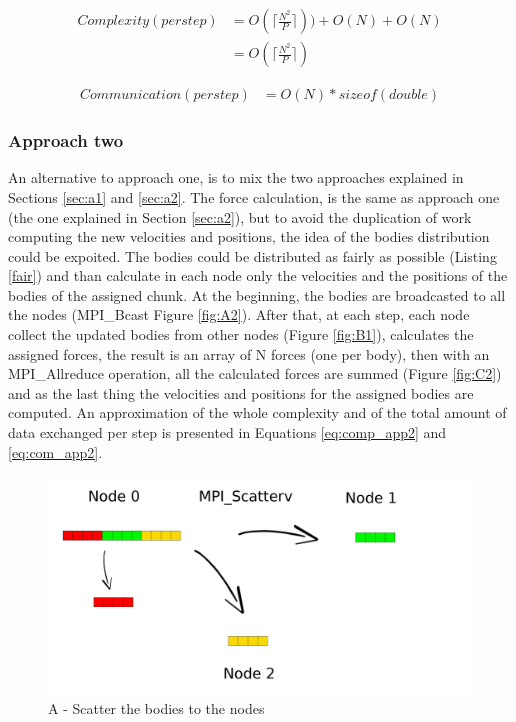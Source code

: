 \documentclass[a4paper]{article}
\begin{document}
\newpage

\begin{equation} \label{eq:comp_app1}
\begin{split}
Complexity (per step) & = O(\lceil\frac{N^2}{P}\rceil)) + O(N) + O(N)\\
 & = O(\lceil\frac{N^2}{P}\rceil)
\end{split}
\end{equation}

\begin{equation} \label{eq:com_app1}
\begin{split}
Communication (per step) & = O(N)*sizeof(double)
\end{split}
\end{equation}

\subsubsection{Approach two}
\label{sec:app_1}
An alternative to approach one, is to mix the two approaches explained in Sections \ref{sec:a1} and \ref{sec:a2}. The force calculation, is the same as approach one (the one explained in Section \ref{sec:a2}), but to avoid the duplication of work computing the new velocities and positions, the idea of the bodies distribution could be expoited. The bodies could be distributed as fairly as possible (Listing \ref{fair}) and than calculate in each node only the velocities and the positions of the bodies of the assigned chunk. At the beginning, the bodies are broadcasted to all the nodes (MPI\_Bcast Figure \ref{fig:A2}). After that, at each step, each node collect the updated bodies from other nodes (Figure \ref{fig:B1}), calculates the assigned forces, the result is an array of N forces (one per body), then with an MPI\_Allreduce operation, all the calculated forces are summed (Figure \ref{fig:C2}) and as the last thing the velocities and positions for the assigned bodies are computed.
An approximation of the whole complexity and of the total amount of data exchanged per step is presented in Equations \ref{eq:comp_app2} and \ref{eq:com_app2}.

\begin{figure}[ht]
  \centering
  \includegraphics[width=0.6\linewidth]{scatter}
  \caption{A - Scatter the bodies to the nodes}
  \label{fig:A1}
\end{figure}
\FloatBarrier
\end{document}
